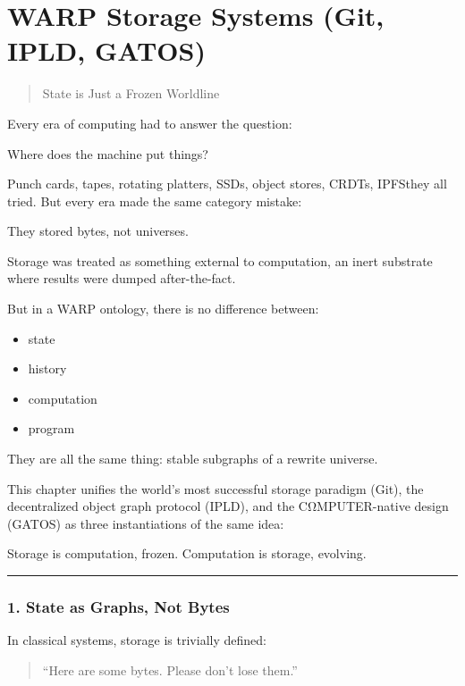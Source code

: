 \chapter{WARP Storage Systems (Git, IPLD,
GATOS)}\label{rmg-storage-systems-git-ipld-gatos}

\begin{quote}
State is Just a Frozen Worldline
\end{quote}

Every era of computing had to answer the question:

Where does the machine put things?

Punch cards, tapes, rotating platters, SSDs, object stores, CRDTs,
IPFS\emd{}they all tried. But every era made the same category mistake:

They stored bytes, not universes.

Storage was treated as something external to computation, an inert
substrate where results were dumped after-the-fact.

But in a WARP ontology, there is no difference between:

\begin{itemize}
\tightlist
\item
  state
\item
  history
\item
  computation
\item
  program
\end{itemize}

They are all the same thing: stable subgraphs of a rewrite universe.

This chapter unifies the world's most successful storage paradigm (Git),
the decentralized object graph protocol (IPLD), and the CΩMPUTER-native
design (GATOS) as three instantiations of the same idea:

Storage is computation, frozen. Computation is storage, evolving.

\begin{center}\rule{0.5\linewidth}{0.5pt}\end{center}

\subsection{1. State as Graphs, Not
Bytes}\label{state-as-graphs-not-bytes}

In classical systems, storage is trivially defined:

\begin{quote}
``Here are some bytes. Please don't lose them.''
\end{quote}

